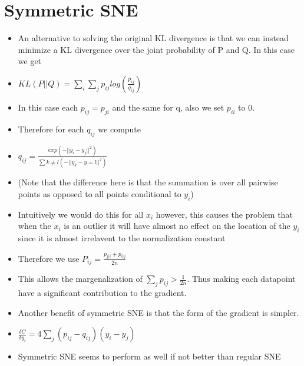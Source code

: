\documentclass[11pt]{article}
\begin{document}
\section{Symmetric SNE}
\label{sec:org5aab0a8}
\begin{itemize}
\item An alternative to solving the original KL divergence is that we can instead minimize a KL divergence over the joint probability of P and Q. In this case we get
\item \(KL(P||Q) = \sum_i \sum_j p_{ij}log(\frac{p_{ij}}{q_{ij}})\)
\item In this case each \(p_{ij} = p_{ji}\) and the same for q, also we set \(p_{ii}\) to 0.
\item Therefore for each \(q_{ij}\) we compute
\item \(q_{ij} = \frac{exp(-||y_i-y_j||^2)}{\sum{k \neq l}(-||y_k - y=l||^2)}\)
\item (Note that the difference here is that the summation is over all pairwise points as opposed to all points conditional to \(y_i\))
\item Intuitively we would do this for all \(x_i\) however, this causes the problem that when the \(x_i\) is an outlier it will have almost no effect on the location of the \(y_i\) since it is almost irrelavent to the normalization constant
\item Therefore we use \(P_{ij} = \frac{p_{j|i}+p_{i|j}}{2n}\)
\item This allows the margenalization of \(\sum_j p_{ij} > \frac{1}{2n}\). Thus making each datapoint have a significant contribution to the gradient.
\item Another benefit of symmetric SNE is that the form of the gradient is simpler.
\item \(\frac{\delta C}{\delta y_i}=4\sum_j(p_{ij}-q_{ij})(y_i-y_j)\)
\item Symmetric SNE seems to perform as well if not better than regular SNE
\end{itemize}
\end{document}
